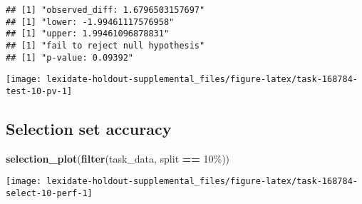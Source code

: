 \documentclass[
]{book}
\newenvironment{Shaded}{\begin{snugshade}}{\end{snugshade}}
\newcommand{\AttributeTok}[1]{\textcolor[rgb]{0.13,0.29,0.53}{#1}}
\newcommand{\DecValTok}[1]{\textcolor[rgb]{0.00,0.00,0.81}{#1}}
\newcommand{\FunctionTok}[1]{\textcolor[rgb]{0.13,0.29,0.53}{\textbf{#1}}}
\newcommand{\NormalTok}[1]{#1}
\newcommand{\OtherTok}[1]{\textcolor[rgb]{0.56,0.35,0.01}{#1}}
\newcommand{\SpecialCharTok}[1]{\textcolor[rgb]{0.81,0.36,0.00}{\textbf{#1}}}
\newcommand{\StringTok}[1]{\textcolor[rgb]{0.31,0.60,0.02}{#1}}
\begin{document}
\begin{Shaded}
\end{Shaded}

\begin{verbatim}
## [1] "observed_diff: 1.6796503157697"
## [1] "lower: -1.99461117576958"
## [1] "upper: 1.99461096878831"
## [1] "fail to reject null hypothesis"
## [1] "p-value: 0.09392"
\end{verbatim}

\texttt{[image: lexidate-holdout-supplemental\_files/figure-latex/task-168784-test-10-pv-1]}

\hypertarget{selection-set-accuracy-51}{%
\subsection{Selection set accuracy}\label{selection-set-accuracy-51}}

\begin{Shaded}
\begin{Highlighting}[]
\FunctionTok{selection\_plot}\NormalTok{(}\FunctionTok{filter}\NormalTok{(task\_data, split }\SpecialCharTok{==} \StringTok{\textquotesingle{}10\%\textquotesingle{}}\NormalTok{))}
\end{Highlighting}
\end{Shaded}

\texttt{[image: lexidate-holdout-supplemental\_files/figure-latex/task-168784-select-10-perf-1]}
\end{document}
